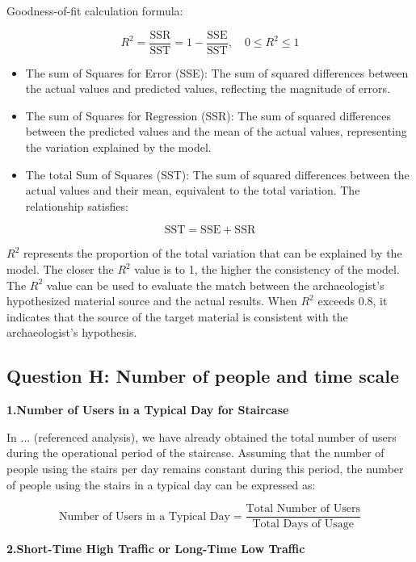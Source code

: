 \documentclass{mcmthesis}
\begin{document}
Goodness-of-fit calculation formula:


\[R^2 = \frac{\text{SSR}}{\text{SST}} = 1 - \frac{\text{SSE}}{\text{SST}}, \quad 0 \leq R^2 \leq 1 \]

\begin{itemize} 

\item The sum of Squares for Error (SSE): The sum of squared differences between the actual values and predicted values, reflecting the magnitude of errors. 

\item The sum of Squares for Regression (SSR): The sum of squared differences between the predicted values and the mean of the actual values, representing the variation explained by the model. 

\item The total Sum of Squares (SST): The sum of squared differences between the actual values and their mean, equivalent to the total variation. The relationship satisfies: 
\end{itemize}



\[\text{SST} = \text{SSE} + \text{SSR}\]

$R^2$ represents the proportion of the total variation that can be explained by the model. The closer the $R^2$ value is to 1, the higher the consistency of the model. The $R^2$ value can be used to evaluate the match between the archaeologist's hypothesized material source and the actual results. When $R^2$ exceeds 0.8, it indicates that the source of the target material is consistent with the archaeologist's hypothesis.


\subsection{Question H: Number of people and time scale}


\textbf{1.Number of Users in a Typical Day for Staircase }


In ... (referenced analysis), we have already obtained the total number of users during the operational period of the staircase. Assuming that the number of people using the stairs per day remains constant during this period, the number of people using the stairs in a typical day can be expressed as:

\[\text{Number of Users in a Typical Day} = \frac{\text{Total Number of Users}}{\text{Total Days of Usage}}\]

\textbf{2.Short-Time High Traffic or Long-Time Low Traffic}
\end{document}

